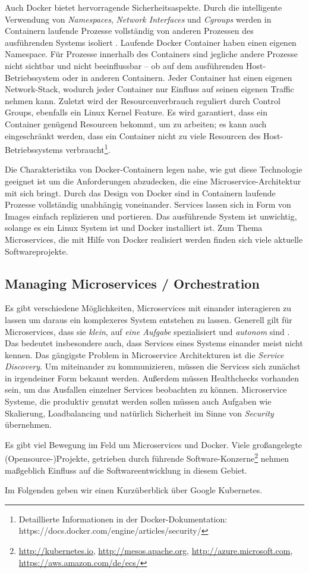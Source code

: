Auch Docker bietet hervorragende Sicherheitsaspekte. Durch die intelligente Verwendung von \textit{Namespaces}, \textit{Network Interfaces} und \textit{Cgroups} werden in Containern laufende Prozesse vollständig von anderen Prozessen des ausführenden Systems isoliert \cite{newman2015,marmol2015}. Laufende Docker Container haben einen eigenen Namespace. Für Prozesse innerhalb des Containers sind jegliche andere Prozesse nicht sichtbar und nicht beeinflussbar -- ob auf dem ausführenden Host-Betriebssystem oder in anderen Containern. Jeder Container hat einen eigenen Network-Stack, wodurch jeder Container nur Einfluss auf seinen eigenen Traffic nehmen kann. Zuletzt wird der Resourcenverbrauch reguliert durch Control Groups, ebenfalls ein Linux Kernel Feature. Es wird garantiert, dass ein Container genügend Resourcen bekommt, um zu arbeiten; es kann auch eingeschränkt werden, dass ein Container nicht zu viele Resourcen des Host-Betriebssystems verbraucht\footnote{Detaillierte Informationen in der Docker-Dokumentation: https://docs.docker.com/engine/articles/security/}.

Die Charakteristika von Docker-Containern legen nahe, wie gut diese Technologie geeignet ist um die Anforderungen abzudecken, die eine Microservice-Architektur mit sich bringt. Durch das Design von Docker sind in Containern laufende Prozesse vollständig unabhängig voneinander. Services lassen sich in Form von Images einfach replizieren und portieren. Das ausführende System ist unwichtig, solange es ein Linux System ist und Docker installiert ist. Zum Thema Microservices, die mit Hilfe von Docker realisiert werden finden sich viele aktuelle Softwareprojekte.


\subsection{Managing Microservices / \glqq Orchestration\grqq}

Es gibt verschiedene Möglichkeiten, Microservices mit einander interagieren zu lassen um daraus ein komplexeres System entstehen zu lassen. Generell gilt für Microservices, dass sie \textit{klein}, auf \textit{eine Aufgabe} spezialisiert und \textit{autonom} sind \cite{newman2015}. Das bedeutet insbesondere auch, dass Services eines Systems einander meist nicht kennen. Das gängigste Problem in Microservice Architekturen ist die \textit{Service Discovery}. Um miteinander zu kommunizieren, müssen die Services sich zunächst in irgendeiner Form bekannt werden. Außerdem müssen Healthchecks vorhanden sein, um das Ausfallen einzelner Services beobachten zu können. Microservice Systeme, die produktiv genutzt werden sollen müssen auch Aufgaben wie Skalierung, Loadbalancing und natürlich Sicherheit im Sinne von \textit{Security} übernehmen. 

Es gibt viel Bewegung im Feld um Microservices und Docker. Viele großangelegte (Opensource-)Projekte, getrieben durch führende Software-Konzerne\footnote{\url{http://kubernetes.io}, \url{http://mesos.apache.org}, \url{http://azure.microsoft.com}, \url{https://aws.amazon.com/de/ecs/}} nehmen maßgeblich Einfluss auf die Softwareentwicklung in diesem Gebiet. 

Im Folgenden geben wir einen Kurzüberblick über Google Kubernetes. 